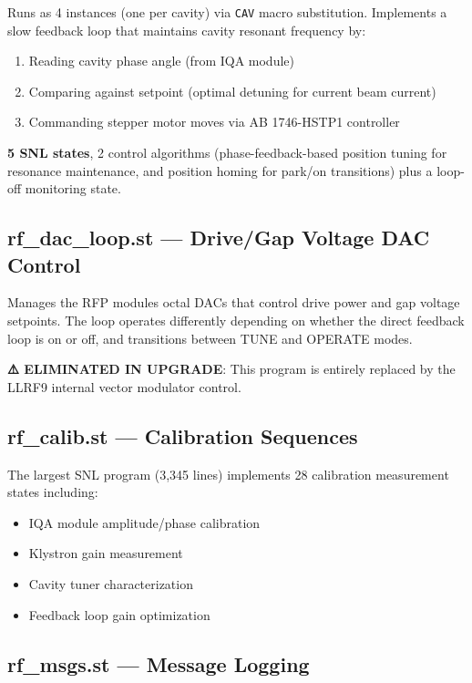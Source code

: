 Runs as 4 instances (one per cavity) via \texttt{CAV} macro substitution. Implements a slow feedback loop that maintains cavity resonant frequency by:

\begin{enumerate}
\def\labelenumi{\arabic{enumi}.}
\tightlist
\item
  Reading cavity phase angle (from IQA module)
\item
  Comparing against setpoint (optimal detuning for current beam current)
\item
  Commanding stepper motor moves via AB 1746-HSTP1 controller
\end{enumerate}

\textbf{5 SNL states}, 2 control algorithms (phase-feedback-based position tuning for resonance maintenance, and position homing for park/on transitions) plus a loop-off monitoring state.

\subsection{rf\_dac\_loop.st --- Drive/Gap Voltage DAC Control}

Manages the RFP module\textquotesingle s octal DACs that control drive power and gap voltage setpoints. The loop operates differently depending on whether the direct feedback loop is on or off, and transitions between TUNE and OPERATE modes.

\textbf{⚠️ ELIMINATED IN UPGRADE}: This program is entirely replaced by the LLRF9 internal vector modulator control.

\subsection{rf\_calib.st --- Calibration Sequences}

The largest SNL program (3,345 lines) implements 28 calibration measurement states including:

\begin{itemize}
\tightlist
\item
  IQA module amplitude/phase calibration
\item
  Klystron gain measurement
\item
  Cavity tuner characterization
\item
  Feedback loop gain optimization
\end{itemize}

\subsection{rf\_msgs.st --- Message Logging}

